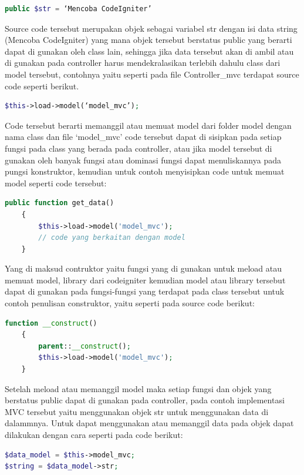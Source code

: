\begin{lstlisting}[language=PHP]
public $str = ‘Mencoba CodeIgniter’ 
\end{lstlisting}
Source code tersebut merupakan objek sebagai variabel str dengan isi data string (Mencoba CodeIgniter) yang mana objek tersebut berstatus public yang berarti dapat di gunakan oleh class lain, sehingga jika data tersebut akan di ambil atau di gunakan pada controller harus mendekralasikan terlebih dahulu class dari model tersebut, contohnya yaitu seperti pada file Controller\_mvc terdapat source code seperti berikut.
\begin{lstlisting}[language=PHP]
$this->load->model(‘model_mvc’);
\end{lstlisting} 
Code tersebut berarti memanggil atau memuat model dari folder model dengan nama class dan file ‘model\_mvc’ code tersebut dapat di sisipkan pada setiap fungsi pada class yang berada pada controller, atau jika model tersebut di gunakan oleh banyak fungsi atau dominasi fungsi dapat menuliskannya pada pungsi konstruktor, kemudian untuk contoh menyisipkan code untuk memuat model seperti code tersebut:
\begin{lstlisting}[language=PHP]
    public function get_data()
    {
        $this->load->model('model_mvc');
        // code yang berkaitan dengan model
    }

\end{lstlisting} 
Yang di maksud contruktor yaitu fungsi yang di gunakan untuk meload atau memuat model, library dari codeigniter kemudian model atau library tersebut dapat di gunakan pada fungsi-fungsi yang terdapat pada class tersebut untuk contoh penulisan construktor, yaitu seperti pada source code berikut:
\begin{lstlisting}[language=PHP]
function __construct()
	{
		parent::__construct();
		$this->load->model('model_mvc');
	}

\end{lstlisting}  
Setelah meload atau memanggil model maka setiap fungsi dan objek yang berstatus public dapat di gunakan pada controller, pada contoh implementasi MVC tersebut yaitu menggunakan objek str untuk menggunakan data di dalammnya. Untuk dapat menggunakan atau memanggil data pada objek dapat dilakukan dengan cara seperti pada code berikut:
\begin{lstlisting}[language=PHP]
$data_model = $this->model_mvc;
$string = $data_model->str;

\end{lstlisting}

